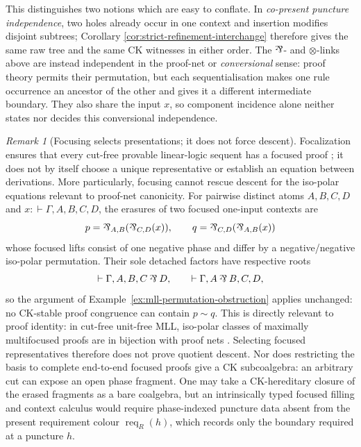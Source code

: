 \documentclass[10pt,a4paper]{article}
\theoremstyle{plain}
\theoremstyle{definition}
\theoremstyle{remark}
\newtheorem{remark}[theorem]{Remark}
\newcommand{\ms}{\mathrel{\vdash}}
\newcommand{\Req}{\operatorname{req}}
\newcommand{\parr}{\mathbin{\rotatebox[origin=c]{180}{\&}}}
\begin{document}
This distinguishes two notions which are easy to conflate.  In
\emph{co-present puncture independence}, two holes already occur in one
context and insertion modifies disjoint subtrees; Corollary
\ref{cor:strict-refinement-interchange} therefore gives the same raw tree
and the same CK witnesses in either order.  The \(\parr\)- and
\(\otimes\)-links above are instead independent in the proof-net or
\emph{conversional} sense: proof theory permits their permutation, but
each sequentialisation makes one rule occurrence an ancestor of the other
and gives it a different intermediate boundary.  They also share the input
\(x\), so component incidence alone neither states nor decides this
conversional independence.

\begin{remark}[Focusing selects presentations; it does not force descent]
\label{rem:focusing-does-not-repair-descent}
Focalization ensures that every cut-free provable linear-logic sequent has a
focused proof \cite{andreoli1992}; it does not by itself choose a unique
representative or establish an equation between derivations.  More
particularly, focusing cannot rescue descent for the iso-polar equations
relevant to proof-net canonicity.  For pairwise distinct atoms \(A,B,C,D\) and
\(
x:\ms\Gamma,A,B,C,D
\), the erasures of two focused one-input contexts are
\[
 p=\parr_{A,B}(\parr_{C,D}(x)),
 \qquad
 q=\parr_{C,D}(\parr_{A,B}(x))
\]
whose focused lifts consist of one negative phase and differ by a
negative/negative iso-polar permutation.  Their sole detached
factors have respective roots
\[
 \ms\Gamma,A,B,C\parr D,
 \qquad
 \ms\Gamma,A\parr B,C,D,
\]
so the argument of Example~\ref{ex:mll-permutation-obstruction} applies
unchanged: no CK-stable proof congruence can contain \(p\sim q\).  This is
directly relevant to proof identity: in cut-free unit-free MLL, iso-polar
classes of maximally multifocused proofs are in bijection with proof nets
\cite{chaudhurimillersaurin2008}.  Selecting focused representatives therefore
does not prove quotient descent.  Nor does restricting the basis to complete
end-to-end focused proofs give a CK subcoalgebra: an arbitrary cut can expose
an open phase fragment.  One may take a CK-hereditary closure of the erased
fragments as a bare coalgebra, but an intrinsically typed focused filling and
context calculus would require phase-indexed puncture data absent from the
present requirement colour \(\Req_R(h)\), which records only the boundary
required at a puncture \(h\).
\end{remark}
\end{document}
